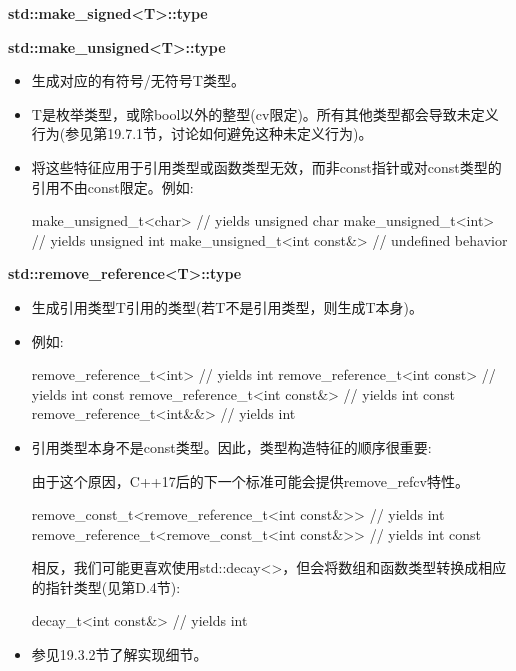\textbf{std::make\_signed<T>::type}

\textbf{std::make\_unsigned<T>::type}

\begin{itemize}
\item
生成对应的有符号/无符号T类型。

\item
T是枚举类型，或除bool以外的整型(cv限定)。所有其他类型都会导致未定义行为(参见第19.7.1节，讨论如何避免这种未定义行为)。

\item
将这些特征应用于引用类型或函数类型无效，而非const指针或对const类型的引用不由const限定。例如:
\begin{cpp}
make_unsigned_t<char> // yields unsigned char
make_unsigned_t<int> // yields unsigned int
make_unsigned_t<int const&> // undefined behavior
\end{cpp}
\end{itemize}

\textbf{std::remove\_reference<T>::type}

\begin{itemize}
\item
生成引用类型T引用的类型(若T不是引用类型，则生成T本身)。

\item
例如:
\begin{cpp}
remove_reference_t<int> // yields int
remove_reference_t<int const> // yields int const
remove_reference_t<int const&> // yields int const
remove_reference_t<int&&> // yields int
\end{cpp}

\item
引用类型本身不是const类型。因此，类型构造特征的顺序很重要:

\begin{notice}
由于这个原因，C++17后的下一个标准可能会提供remove\_refcv特性。
\end{notice}

\begin{cpp}
remove_const_t<remove_reference_t<int const&>> // yields int
remove_reference_t<remove_const_t<int const&>> // yields int const
\end{cpp}

相反，我们可能更喜欢使用std::decay<>，但会将数组和函数类型转换成相应的指针类型(见第D.4节):

\begin{cpp}
decay_t<int const&> // yields int
\end{cpp}

\item
参见19.3.2节了解实现细节。
\end{itemize}

